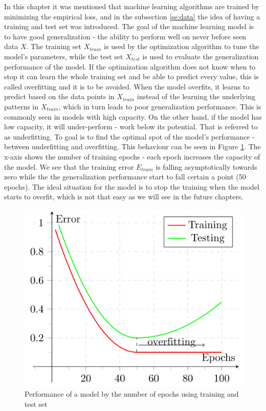 \documentclass[times, utf8, diplomski]{fer}
\begin{document}
In this chapter it was mentioned that machine learning algorithms are trained by minimizing the empirical loss, and in the subsection \ref{se:data} the idea of having a training and test set was introduced. The goal of the machine learning model is to have good generalization - the ability to perform well on never before seen data $X$. The training set $X_{train}$ is used by the optimization algorithm to tune the model's parameters, while the test set $X_{test}$ is used to evaluate the generalization performance of the model. If the optimization algorithm does not know when to stop it can learn the whole training set and be able to predict every value, this is called overfitting and it is to be avoided. When the model overfits, it learns to predict based on the data points in $X_{train}$ instead of the learning the underlying patterns in $X_{train}$, which in turn leads to poor generalization performance. This is commonly seen in models with high capacity. On the other hand, if the model has low capacity, it will under-perform - work below its potential. That is referred to as underfitting. To goal is to find the optimal spot of the model's performance - between underfitting and overfitting. This behaviour can be seen in Figure \ref{fig:overfitting}. The x-axis shows the number of training epochs - each epoch increases the capacity of the model. We see that the training error $E_{train}$ is falling asymptotically towards zero while the the generalization performance start to fall certain a point (50 epochs). The ideal situation for the model is to stop the training when the model starts to overfit, which is not that easy as we will see in the future chapters.


\begin{figure}
  \includegraphics[scale=0.43]{figures/overfitting.png}
  \centering
  \caption{Performance of a model by the number of epochs using training and test set}
  \label{fig:overfitting}
\end{figure}
\end{document}
